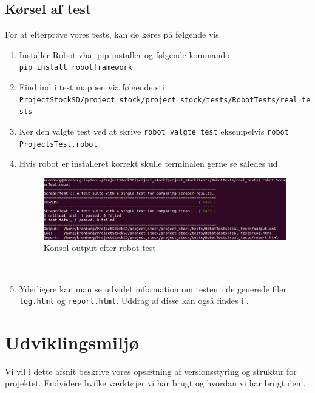 \documentclass[12pt]{article}
\begin{document}
\subsection{Kørsel af test}
For at efterprøve vores tests, kan de køres på følgende vis
\begin{enumerate}
  \item Installer Robot vha. pip installer og følgende kommando\\
  \texttt{pip install robotframework}
  \item Find ind i test mappen via følgende sti \\ \texttt{ProjectStockSD/project\_stock/project\_stock/tests/RobotTests/real\_tests} 
  \item Kør den valgte test ved at skrive \texttt{robot valgte test} eksempelvis
  \texttt{robot ProjectsTest.robot}
  \item Hvis robot er installeret korrekt skulle terminalen gerne se således ud 
    \begin{figure}[H]
        \centering
        \includegraphics[scale=0.5]{test.png}
        \caption{Konsol output efter robot test}
        \label{fig:console output}
    \end{figure}~
  \item Yderligere kan man se udvidet information om testen i de generede filer \texttt{log.html} og \texttt{report.html}. Uddrag af disse kan også findes i .
\end{enumerate}
\section{Udviklingsmiljø}
\label{sec:udvikling}
Vi vil i dette afsnit beskrive vores opsætning af versionsstyring og struktur for projektet. Endvidere hvilke værktøjer vi har brugt og hvordan vi har brugt dem.
\end{document}
